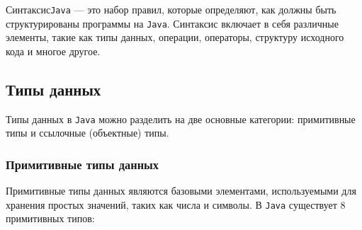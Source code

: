 Синтаксис\texttt{Java} — это набор правил, которые определяют, как должны быть структурированы программы на \texttt{Java}. Синтаксис включает в себя различные элементы, такие как типы данных, операции, операторы, структуру исходного кода и многое другое.

\subsection{Типы данных}
Типы данных в \texttt{Java} можно разделить на две основные категории: примитивные типы и ссылочные (объектные) типы.

\subsubsection{Примитивные типы данных}
Примитивные типы данных являются базовыми элементами, используемыми для хранения простых значений, таких как числа и символы. В \texttt{Java} существует 8 примитивных типов:

